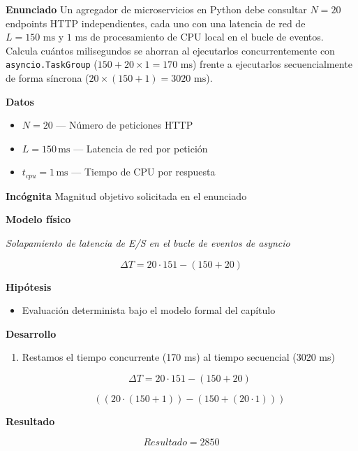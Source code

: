 \documentclass{book}
\begin{document}
\begin{tcolorbox}[title={Problema resuelto}, studiumworked, breakable]

\noindent\textbf{Enunciado}
Un agregador de microservicios en Python debe consultar \(N = 20\) endpoints HTTP independientes, cada uno con una latencia de red de \(L = 150\text{ ms}\) y \(1\text{ ms}\) de procesamiento de CPU local en el bucle de eventos. Calcula cuántos milisegundos se ahorran al ejecutarlos concurrentemente con \texttt{asyncio.TaskGroup} (\(150 + 20 \times 1 = 170\text{ ms}\)) frente a ejecutarlos secuencialmente de forma síncrona (\(20 \times (150 + 1) = 3020\text{ ms}\)).

\noindent\textbf{Datos}
\begin{itemize}
\item $N = 20$ — Número de peticiones HTTP
\item $L = 150\,\mathrm{ms}$ — Latencia de red por petición
\item $t_{cpu} = 1\,\mathrm{ms}$ — Tiempo de CPU por respuesta
\end{itemize}

\noindent\textbf{Incógnita}
Magnitud objetivo solicitada en el enunciado

\noindent\textbf{Modelo físico}

\noindent\textit{Solapamiento de latencia de E/S en el bucle de eventos de asyncio}

\[
\Delta T = 20 \cdot 151 - (150 + 20)
\]

\noindent\textbf{Hipótesis}
\begin{itemize}
\item Evaluación determinista bajo el modelo formal del capítulo
\end{itemize}

\noindent\textbf{Desarrollo}
\begin{enumerate}
\item
Restamos el tiempo concurrente (170 ms) al tiempo secuencial (3020 ms)

\[
\Delta T = 20 \cdot 151 - (150 + 20)
\]

\[
\left(\left(20\cdot \left(150+1\right)\right)-\left(150+\left(20\cdot 1\right)\right)\right)
\]
\end{enumerate}

\noindent\textbf{Resultado}

\[
Resultado = 2850
\]


\end{tcolorbox}
\end{document}
